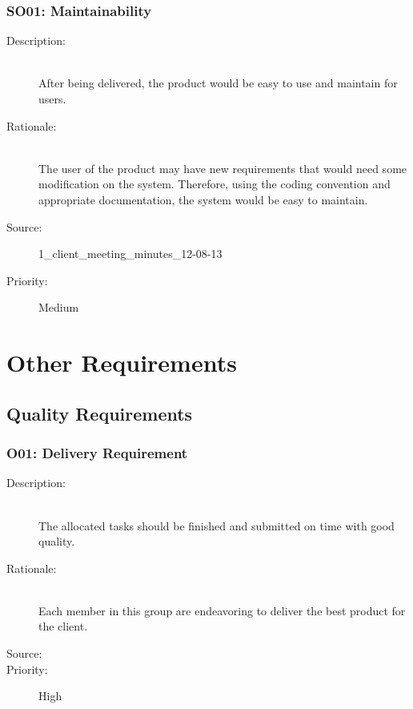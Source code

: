\documentclass[titlepage]{article}
\begin{document}
\subsubsection{SO01: Maintainability}
\begin{description}
\item[Description: ] \hfill \\ After being delivered, the product would be easy to use and maintain for users.
\item[Rationale: ] \hfill \\ The user of the product may have new requirements that would need some modification on the system. Therefore, using the coding convention and appropriate documentation, the system would be easy to maintain.
\item[Source: ] 1\_client\_meeting\_minutes\_12-08-13
\item[Priority: ] Medium
\end{description}


\newpage




\section{Other Requirements}
\subsection{Quality Requirements}
\subsubsection{O01: Delivery Requirement}
\begin{description}
\item[Description: ] \hfill \\ The allocated tasks should be finished and submitted on time with good quality.
\item[Rationale: ] \hfill \\ Each member in this group are endeavoring to deliver the best product for the client.
\item[Source: ]  
\item[Priority: ] High
\end{description}

\newpage

\appendix
\end{document}
